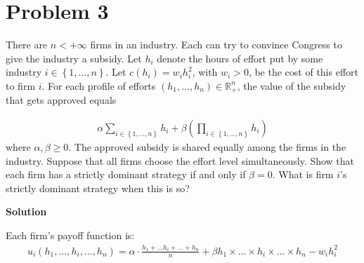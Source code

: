 \documentclass[a4paper]{article}
\begin{document}
\section*{Problem 3}
There are $n < +\infty$ firms in an industry. Each can try to convince Congress
to give the industry a subsidy. Let $h_i$ denote the hours of effort put by
some industry $i \in \left\{1,\dots , n\right\}$. Let $c(h_i) = w_ih_i^2$, with $w_i > 0$, be the cost of
this effort to firm $i$. For each profile of efforts $(h_1, \dots , h_n) \in \mathbb{R}^n_+$, the value
of the subsidy that gets approved equals

\begin{align*}
\alpha \sum_{i \in \left\{1, \dots, n\right\}} h_i + \beta \left(\prod_{i \in \left\{1, \dots, n\right\}} h_i\right)
\end{align*}
where $\alpha, \beta \ge 0$. The approved subsidy is shared equally among the firms in
the industry. Suppose that all firms choose the effort level simultaneously.
Show that each firm has a strictly dominant strategy if and only if $\beta = 0$.
What is firm $i$’s strictly dominant strategy when this is so?


\textbf{Solution}


Each firm's payoff function is:
\begin{align*}
u_i(h_1, \dots, h_i, \dots, h_n) = \alpha \cdot \frac{h_1 + \dots h_i + \dots + h_n}{n} + \beta h_1\times\dots\times h_i \times \dots\times h_n - w_ih_i^2
\end{align*}
\end{document}
